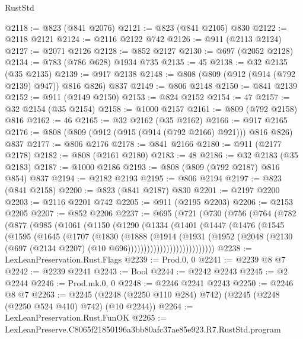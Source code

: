 \begin{lexlean}{RustStd}
\begin{coremodule}
@2118 := @823 (@841 @2076)
@2121 := @823 (@841 @2105) @830
@2122 := @2118 @2121
@2124 := @2116 @2122 @742
@2126 := @911 (@2113 @2124)
@2127 := @2071 @2126
@2128 := @852 @2127
@2130 := @697 (@2052 @2128)
@2134 := @783 (@786 @628) @1934 @735
@2135 := 45
@2138 := @32 @2135 (@35 @2135)
@2139 := @917 @2138
@2148 := @808 (@809 (@912 (@914 (@792 @2139) @947)) @816 @826) @837
@2149 := @806 @2148
@2150 := @841 @2139
@2152 := @911 (@2149 @2150)
@2153 := @824 @2152
@2154 := 47
@2157 := @32 @2154 (@35 @2154)
@2158 := @1000 @2157
@2161 := @809 (@792 @2158) @816
@2162 := 46
@2165 := @32 @2162 (@35 @2162)
@2166 := @917 @2165
@2176 := @808 (@809 (@912 (@915 (@914 (@792 @2166) @921))) @816 @826) @837
@2177 := @806 @2176
@2178 := @841 @2166
@2180 := @911 (@2177 @2178)
@2182 := @808 (@2161 @2180)
@2183 := 48
@2186 := @32 @2183 (@35 @2183)
@2187 := @1000 @2186
@2193 := @808 (@809 (@792 @2187) @816 @854) @837
@2194 := @2182 @2193
@2195 := @806 @2194
@2197 := @823 (@841 @2158)
@2200 := @823 (@841 @2187) @830
@2201 := @2197 @2200
@2203 := @2116 @2201 @742
@2205 := @911 (@2195 @2203)
@2206 := @2153 @2205
@2207 := @852 @2206
@2237 := @695
    (@721
      (@730
        (@756
          (@764
            (@782
              (@877
                (@985
                  (@1061
                    (@1150
                      (@1290
                        (@1334
                          (@1401
                            (@1447
                              (@1476
                                (@1545
                                  (@1595
                                    (@1645
                                      (@1707
                                        (@1830
                                          (@1888
                                            (@1914
                                              (@1931
                                                (@1952
                                                  (@2048
                                                    (@2130
                                                      (@697
                                                        (@2134 @2207)
                                                        (@10 @696)))))))))))))))))))))))))))
@2238 := LexLeanPreservation.Rust.Flags
@2239 := Prod.{0, 0}
@2241 := @2239 @8 @7
@2242 := @2239 @2241
@2243 := Bool
@2244 := @2242 @2243
@2245 := @2 @2244
@2246 := Prod.mk.{0, 0}
@2248 := @2246 @2241 @2243
@2250 := @2246 @8 @7
@2263 := @2245 (@2248 (@2250 @110 @284) @742) (@2245 (@2248 (@2250 @524 @410) @742) (@10 @2244))
@2264 := LexLeanPreservation.Rust.FunOK
@2265 := LexLeanPreserve.C8065f21850196a3bb80afc37ae85e923.R7.RustStd.program

\end{coremodule}
\end{lexlean}
